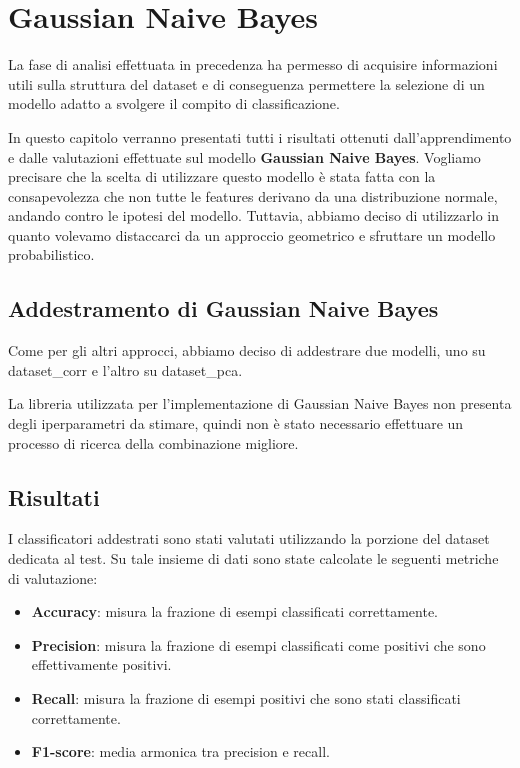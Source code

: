 \chapter{Gaussian Naive Bayes} \label{chp:bayes}
La fase di analisi effettuata in precedenza ha permesso di acquisire informazioni
utili sulla struttura del dataset e di conseguenza permettere la selezione di un
modello adatto a svolgere il compito di classificazione.

In questo capitolo verranno presentati tutti i risultati ottenuti dall'apprendimento
e dalle valutazioni effettuate sul modello \textbf{Gaussian Naive Bayes}. Vogliamo
precisare che la scelta di utilizzare questo modello è stata fatta con la
consapevolezza che non tutte le features derivano da una distribuzione normale,
andando contro le ipotesi del modello. Tuttavia, abbiamo deciso di utilizzarlo
in quanto volevamo distaccarci da un approccio geometrico e sfruttare un modello
probabilistico.
\section{Addestramento di Gaussian Naive Bayes}
Come per gli altri approcci, abbiamo deciso di addestrare due modelli, uno su
dataset\_corr e l'altro su dataset\_pca.

La libreria utilizzata per l'implementazione di Gaussian Naive Bayes non 
presenta degli iperparametri da stimare, quindi non è stato necessario effettuare
un processo di ricerca della combinazione migliore.
\section{Risultati}
I classificatori addestrati sono stati valutati utilizzando la porzione del 
dataset dedicata al test. Su tale insieme di dati sono state calcolate le
seguenti metriche di valutazione:
\begin{itemize}
    \item \textbf{Accuracy}: misura la frazione di esempi classificati correttamente.
    \item \textbf{Precision}: misura la frazione di esempi classificati come positivi
    che sono effettivamente positivi.
    \item \textbf{Recall}: misura la frazione di esempi positivi che sono stati
    classificati correttamente.
    \item \textbf{F1-score}: media armonica tra precision e recall.
\end{itemize}

